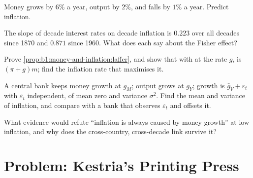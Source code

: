 \begin{exercise}[$\star\star$]\label{exo:b1:money-and-inflation:velfall}
Money grows by $6\%$ a year, output by $2\%$, and  falls by $1\%$ a year.
Predict inflation.
\end{exercise}

\begin{exercise}[$\star\star$]\label{exo:b1:money-and-inflation:fisher-slope}
The slope of decade interest rates on decade inflation is $0.223$ over all
decades since 1870 and $0.871$ since 1960. %
What does each say about the Fisher effect?
\end{exercise}

\begin{exercise}[$\star\star\star$]\label{exo:b1:money-and-inflation:derive}
Prove \cref{prop:b1:money-and-inflation:laffer}, and show that with 
at the rate $g$,  is $(\pi + g)m$; find the inflation rate that maximises it.
\end{exercise}

\begin{exercise}[$\star\star\star$]\label{exo:b1:money-and-inflation:rule}
A central bank keeps money growth at $g_M$; output grows at $g_Y$;  growth
is $\bar g_V + \varepsilon_t$ with $\varepsilon_t$ independent, of mean zero and variance $\sigma^2$. Find the mean and
variance of inflation, and compare with a bank that observes $\varepsilon_t$ and offsets
it.
\end{exercise}

\begin{exercise}[$\star\star\star$]\label{exo:b1:money-and-inflation:refute}
What evidence would refute ``inflation is always caused by money growth'' at
low inflation, and why does the cross-country, cross-decade link survive
it?
\end{exercise}

\section{Problem: Kestria's Printing Press}\label{sec:b1:money-and-inflation:problem}

